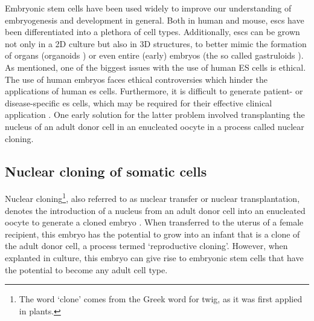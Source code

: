 Embryonic stem cells have been used widely to improve our understanding of embryogenesis and development in general. 
Both in human and mouse, \glspl{esc} have been differentiated into a plethora of cell types.
Additionally, \glspl{esc} can be grown not only in a 2D culture but also in 3D structures, to better mimic the formation of organs (organoids \cite{clevers2016modeling, lancaster2013cerebral}) or even entire (early) embryos (the so called gastruloids \cite{van2020single2}).\\





As mentioned, one of the biggest issues with the use of human ES cells is ethical.
The use of human embryos faces ethical controversies which hinder the applications of human \gls{es} cells. 
Furthermore, it is difficult to generate patient- or disease-specific \gls{es} cells, which may be required for their effective clinical application \cite{yamanaka2007strategies}.
One early solution for the latter problem involved transplanting the nucleus of an adult donor cell in an enucleated oocyte in a process called nuclear cloning.

\subsection{Nuclear cloning of somatic cells}
\label{sec:cloning} 

Nuclear cloning\footnote{The word `clone' comes from the Greek word for twig, as it was first applied in plants.}, also referred to as nuclear transfer or nuclear transplantation, denotes the introduction of a nucleus from an adult donor cell into an enucleated oocyte to generate a cloned embryo \cite{hochedlinger2003nuclear}.
When transferred to the uterus of a female recipient, this embryo has the potential to grow into an infant that is a clone of the adult donor cell, a process termed `reproductive cloning'. 
However, when explanted in culture, this embryo can give rise to embryonic stem cells that have the potential to become any adult cell type.\\

